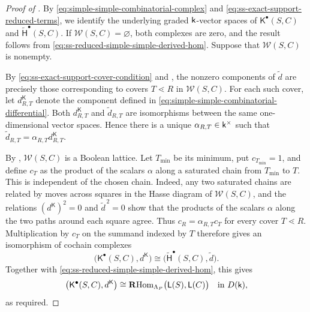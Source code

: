 \begin{proof}[Proof of ]
By \eqref{eq:simple-simple-combinatorial-complex} and
\eqref{eq:ss-exact-support-reduced-terms}, we identify the underlying
graded $\mathsf{k}$-vector spaces of $\mathsf K^\bullet(S,C)$ and
$\widetilde{\mathsf H}^\bullet(S,C)$. If
$\mathcal W(S,C)=\varnothing$, both complexes are zero, and the result
follows from \eqref{eq:ss-reduced-simple-simple-derived-hom}.
Suppose that $\mathcal W(S,C)$ is nonempty.

By \eqref{eq:ss-exact-support-cover-condition} and
, the nonzero components of
$\widetilde d$ are precisely those corresponding to covers
$T\lessdot R$ in $\mathcal W(S,C)$. For each such cover, let
$d^{\mathsf K}_{R,T}$ denote the component defined in
\eqref{eq:simple-simple-combinatorial-differential}.
Both $d^{\mathsf K}_{R,T}$ and $\widetilde d_{R,T}$ are isomorphisms
between the same one-dimensional vector spaces. Hence there is a
unique $\alpha_{R,T}\in\mathsf{k}^\times$ such that
$\widetilde d_{R,T}=\alpha_{R,T}d^{\mathsf K}_{R,T}$.

By ,
$\mathcal W(S,C)$ is a Boolean lattice. Let $T_{\min}$ be its
minimum, put $c_{T_{\min}}=1$, and define $c_T$ as the product of the
scalars $\alpha$ along a saturated chain from $T_{\min}$ to $T$.
This is independent of the chosen chain. Indeed, any two saturated
chains are related by moves across squares in the Hasse diagram of
$\mathcal W(S,C)$, and the relations
$(d^{\mathsf K})^2=0$ and $\widetilde d^{\,2}=0$ show that the
products of the scalars $\alpha$ along the two paths around each
square agree. Thus $c_R=\alpha_{R,T}c_T$ for every cover
$T\lessdot R$.
Multiplication by $c_T$ on the summand indexed by $T$ therefore gives
an isomorphism of cochain complexes
\[
\bigl(\mathsf K^\bullet(S,C),d^{\mathsf K}\bigr)
\cong
\bigl(\widetilde{\mathsf H}^\bullet(S,C),\widetilde d\bigr).
\]
Together with \eqref{eq:ss-reduced-simple-simple-derived-hom}, this
gives
\[
\bigl(\mathsf K^\bullet(S,C),d^{\mathsf K}\bigr)
\cong
\mathbf R\!\operatorname{Hom}_{\Lambda_P}\bigl(\mathsf L(S),\mathsf L(C)\bigr)
\quad\text{in }D(\mathsf{k}),
\]
as required.
\end{proof}

